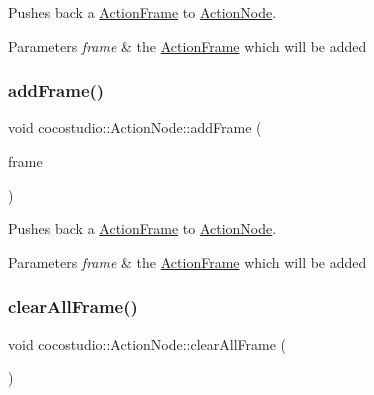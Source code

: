 Pushes back a \hyperlink{classcocostudio_1_1ActionFrame}{Action\+Frame} to \hyperlink{classcocostudio_1_1ActionNode}{Action\+Node}.


\begin{DoxyParams}{Parameters}
{\em frame} & the \hyperlink{classcocostudio_1_1ActionFrame}{Action\+Frame} which will be added \\
\hline
\end{DoxyParams}
\mbox{\label{classcocostudio_1_1ActionNode_a982d01cb4931e108f5d02bf3cc6ec9c3}} 
\subsubsection{\texorpdfstring{add\+Frame()}{addFrame()}\hspace{0.1cm}{\footnotesize\ttfamily [2/2]}}
{\footnotesize\ttfamily void cocostudio\+::\+Action\+Node\+::add\+Frame (\begin{DoxyParamCaption}\item[{\hyperlink{classcocostudio_1_1ActionFrame}{Action\+Frame} $\ast$}]{frame }\end{DoxyParamCaption})}

Pushes back a \hyperlink{classcocostudio_1_1ActionFrame}{Action\+Frame} to \hyperlink{classcocostudio_1_1ActionNode}{Action\+Node}.


\begin{DoxyParams}{Parameters}
{\em frame} & the \hyperlink{classcocostudio_1_1ActionFrame}{Action\+Frame} which will be added \\
\hline
\end{DoxyParams}
\mbox{\label{classcocostudio_1_1ActionNode_aecb985671dc22f4e3beecadbd63badd9}} 
\subsubsection{\texorpdfstring{clear\+All\+Frame()}{clearAllFrame()}\hspace{0.1cm}{\footnotesize\ttfamily [1/2]}}
{\footnotesize\ttfamily void cocostudio\+::\+Action\+Node\+::clear\+All\+Frame (\begin{DoxyParamCaption}{ }\end{DoxyParamCaption})}


